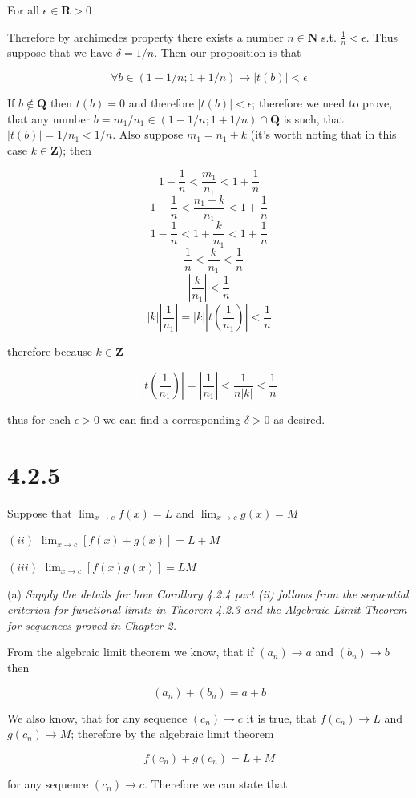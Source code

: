\documentclass[11pt,oneside,titlepage]{article}
\begin{document}
For all $\epsilon \in \textbf{R} > 0$

Therefore by archimedes property there exists a number $n \in \textbf{N}$ s.t. $\frac{1}{n} < \epsilon$.
Thus suppose that we have $\delta = 1/n$. Then our proposition is that 

$$\forall b \in (1 - 1/n; 1 + 1/n) \to |t(b)| < \epsilon$$

If $b \notin \textbf{Q} $ then $t(b) = 0$ and therefore $|t(b)| < \epsilon$; therefore we need to prove,
that any number $b = m_1/n_1 \in (1 - 1/n; 1 + 1/n) \cap \textbf{Q}$ is such, that $|t(b)| = 1/n_1 < 1/n$.
Also suppose $m_1 = n_1 + k$ (it's worth noting that in this case $k \in \textbf{Z}$); then

$$ 1 - \frac{1}{n} < \frac{m_1}{n_1} < 1 + \frac{1}{n}$$
$$ 1 - \frac{1}{n} < \frac{n_1 + k}{n_1} < 1 + \frac{1}{n}$$
$$ 1 - \frac{1}{n} < 1 + \frac{k}{n_1} < 1 + \frac{1}{n}$$
$$ - \frac{1}{n} <  \frac{k}{n_1} <  \frac{1}{n}$$
$$ |\frac{k}{n_1}| <  \frac{1}{n}$$
$$ |k||\frac{1}{n_1}| = |k||t(\frac{1}{n_1})| <  \frac{1}{n}$$

therefore because $k \in \textbf{Z}$

$$ |t(\frac{1}{n_1})| = |\frac{1}{n_1}| <  \frac{1}{n|k|} < \frac{1}{n}$$

thus for each $\epsilon > 0$ we can find a corresponding $\delta > 0$ as desired.

\section*{4.2.5}
Suppose that $\lim_{x \to c} f(x) = L$ and $\lim_{x \to c} g(x) = M$

$(ii)$ $\lim_{x \to c}[f(x) + g(x)] = L + M$

$(iii)$ $\lim_{x \to c}[f(x) g(x)] = L M$

(a)\textit{ Supply the details for how Corollary 4.2.4 part (ii) follows from the sequential criterion for functional limits in Theorem 4.2.3 and the Algebraic Limit Theorem for sequences proved in Chapter 2.}

From the algebraic limit theorem we know, that if $(a_n) \to a$ and $(b_n) \to b$ then

$$(a_n) + (b_n) = a + b$$

We also know, that for any sequence $(c_n) \to c$ it is true, that $f(c_n) \to L$ and $g(c_n) \to M$;
therefore by the algebraic limit theorem

$$f(c_n) + g(c_n) = L + M$$

for any sequence $(c_n) \to c$. Therefore we can state that
\end{document}
